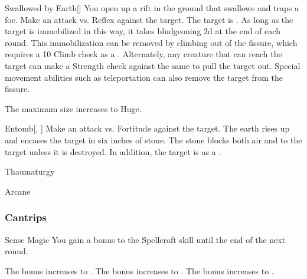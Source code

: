 \lowercase{\hypertarget{spell:Swallowed by Earth}{}}\label{spell:Swallowed by Earth}
\begin{freeability}[Rank 6]{\hypertarget{spell:Swallowed by Earth}{Swallowed by Earth}}[]
You open up a rift in the ground that swallows and traps a foe.
Make an attack vs. Reflex against the target.
\hit The target is .
As long as the target is immobilized in this way,
it takes bludgeoning  \minus2d at the end of each round.
This immobilization can be removed by climbing out of the fissure, which requires a  10 Climb check as a .
Alternately, any creature that can reach the target can make a Strength check against the same  to pull the target out.
Special movement abilities such as teleportation can also remove the target from the fissure.

\rankline
{} The maximum size increases to Huge.
\end{freeability}
\vspace{0.25em}



\lowercase{\hypertarget{spell:Entomb}{}}\label{spell:Entomb}
\begin{freeability}[Rank 8]{\hypertarget{spell:Entomb}{Entomb}}[, ]
Make an attack vs. Fortitude against the target.
\hit The earth rises up and encases the target in six inches of stone.
The stone blocks both air and  to the target unless it is destroyed.
In addition, the target is  as a .
\end{freeability}
\vspace{0.25em}


\newpage
\begin{spellsection}{Thaumaturgy}

\begin{spellheader}
\end{spellheader}


 Arcane

\subsubsection{Cantrips}


\begin{freeability}{Sense Magic}
You gain a  bonus to the Spellcraft skill until the end of the next round.

\rankline
{} The bonus increases to .
 The bonus increases to .
 The bonus increases to .
\end{freeability}

\end{spellsection}


